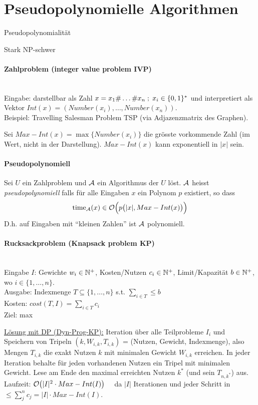 \section{Pseudopolynomielle Algorithmen}

\begin{takeaway}
    \item Pseudopolynomialität
    \item Stark NP-schwer
\end{takeaway}

\paragraph{Zahlproblem (integer value problem IVP)} \mbox{} \\
Eingabe: darstellbar als Zahl $ x = x_1 \# \dots \# x_n \; ; \; x_i \in \lbrace 0, 1 \rbrace^* $
und interpretiert als Vektor $Int(x) = (Number(x_i), \dots, Number(x_n))$. \\
Beispiel: Travelling Salesman Problem TSP (via Adjazenzmatrix des Graphen).

Sei $Max-Int(x) = \max \{ Number(x_i) \}$ die grösste vorkommende Zahl (im Wert, nicht in der Darstellung).
$Max-Int(x)$ kann exponentiell in $|x|$ sein.

\paragraph{Pseudopolynomiell}
Sei $U$ ein Zahlproblem und $\mathcal{A}$ ein Algorithmus der $U$ löst.
$\mathcal{A}$ heisst \emph{pseudopolynomiell} falls für alle Eingaben $x$ ein Polynom $p$ existiert, so dass
$$ \text{time}_{\mathcal{A}} (x) \in \mathcal{O} \Big( p \big( |x| , Max-Int(x) \big) \Big) $$
D.h. auf Eingaben mit ``kleinen Zahlen'' ist $\mathcal{A}$ polynomiell.

\paragraph{Rucksackproblem (Knapsack problem KP)}\label{algo-kp} \mbox{} \\
Eingabe $I$: Gewichte $w_i \in \mathbb{N}^+$, Kosten/Nutzen $c_i \in \mathbb{N}^+$, Limit/Kapazität $b \in \mathbb{N}^+$, wo $i \in \{ 1, \dots, n \} $. \\
Ausgabe: Indexmenge $T \subseteq \{ 1, \dots, n \}$ s.t. $\sum_{i \in T } \leq b$ \\
Kosten: $cost(T, I) = \sum_{i \in T} c_i$ \\
Ziel: max

\underline{Lösung mit DP (Dyn-Prog-KP):}
Iteration über alle Teilprobleme $I_i$ und Speichern von Tripeln
$(k, W_{i, k}, T_{i, k})$ = (Nutzen, Gewicht, Indexmenge), also Mengen $T_{i, k}$
die exakt Nutzen $k$ mit minimalen Gewicht $W_{i, k}$ erreichen.
In jeder Iteration behalte für jeden vorhandenen Nutzen ein Tripel mit minimalen Gewicht.
Lese am Ende den maximal erreichten Nutzen $k^*$ (und sein $T_{n, k^*}$) aus.
\\
Laufzeit: $ \mathcal{O} \big( |I|^2 \cdot Max-Int(I) \big) \quad$ da $|I|$ Iterationen und
jeder Schritt in $\leq \sum_j^n c_j = |I| \cdot Max-Int(I)$.

